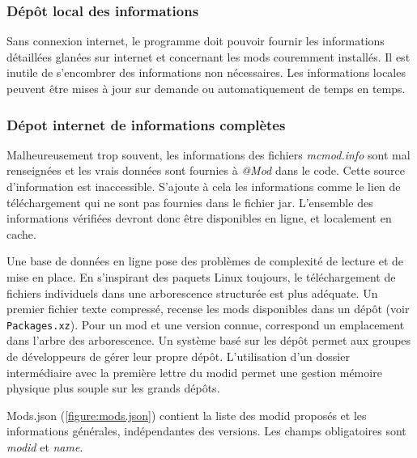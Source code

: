 \documentclass{article}
\begin{document}
\subsubsection{Dépôt local des informations}
\label{section:depot_local}
Sans connexion internet, le programme doit pouvoir fournir les informations détaillées glanées sur internet et concernant les mods couremment installés.
Il est inutile de s'encombrer des informations non nécessaires.
Les informations locales peuvent être mises à jour sur demande ou automatiquement de temps en temps.

\subsubsection{Dépot internet de informations complètes}
Malheureusement trop souvent, les informations des fichiers \textit{mcmod.info} sont mal renseignées et les vrais données sont fournies à \textit{@Mod} dans le code.
Cette source d'information est inaccessible.
S'ajoute à cela les informations comme le lien de téléchargement qui ne sont pas fournies dans le fichier jar.
L'ensemble des informations vérifiées devront donc être disponibles en ligne, et localement en cache.

Une base de données en ligne pose des problèmes de complexité de lecture et de mise en place.
En s'inspirant des paquets Linux toujours, le téléchargement de fichiers individuels dans une arborescence structurée est plus adéquate.
Un premier fichier texte compressé, recense les mods disponibles dans un dépôt (voir \texttt{Packages.xz}).
Pour un mod et une version connue, correspond un emplacement dans l'arbre des arborescence.
Un système basé sur les dépôt permet aux groupes de développeurs de gérer leur propre dépôt.
L'utilisation d'un dossier intermédiaire avec la première lettre du modid permet une gestion mémoire physique plus souple sur les grands dépôts.


Mods.json (\ref{figure:mods.json}) contient la liste des modid proposés et les informations générales, indépendantes des versions.
Les champs obligatoires sont \textit{modid} et \textit{name}.
\end{document}

